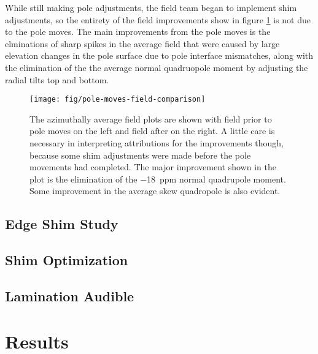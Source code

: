 While still making pole adjustments, the field team began to implement shim adjustments, so the entirety of the field improvements show in figure \ref{fig:pole-moves-field-comparison} is not due to the pole moves.  The main improvements from the pole moves is the elminations of sharp spikes in the average field that were caused by large elevation changes in the pole surface due to pole interface mismatches, along with the elimination of the the average normal quadruopole moment by adjusting the radial tilts top and bottom.

\begin{figure}
\texttt{[image: fig/pole-moves-field-comparison]}
\caption{The azimuthally average field plots are shown with field prior to pole moves on the left and field after on the right.  A little care is necessary in interpreting attributions for the improvements though, because some shim adjustments were made before the pole movements had completed.  The major improvement shown in the plot is the elimination of the \SI{-18}{ppm} normal quadrupole moment.  Some improvement in the average skew quadropole is also evident.}
\label{fig:pole-moves-field-comparison}
\end{figure}


\subsection{Edge Shim Study}


\subsection{Shim Optimization}


\subsection{Lamination Audible}


\section{Results}